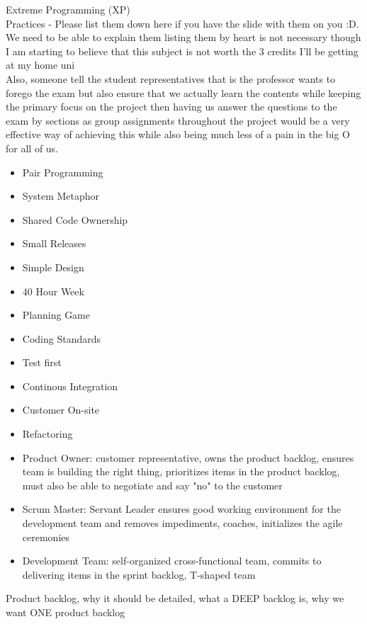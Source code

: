 \documentclass[10pt]{article}
\begin{document}
Extreme Programming (XP)\\
Practices - Please list them down here if you have the slide with them on you :D. We need to be able to explain them listing them by heart is not necessary though\\
I am starting to believe that this subject is not worth the 3 credits I'll be getting at my home uni\\
Also, someone tell the student representatives that is the professor wants to forego the exam but also ensure that we actually learn the contents while keeping the primary focus on the project then having us answer the questions to the exam by sections as group assignments throughout the project would be a very effective way of achieving this while also being much less of a pain in the big O for all of us.
\begin{itemize}
    \item Pair Programming 
    \item System Metaphor
    \item Shared Code Ownership
    \item Small Releases
    \item Simple Design
    \item 40 Hour Week
    \item Planning Game
    \item Coding Standards
    \item Test first
    \item Continous Integration 
    \item Customer On-site
    \item Refactoring
\end{itemize}
\begin{itemize}
\item Product Owner: customer representative, owns the product backlog, ensures team is building the right thing, prioritizes items in the product backlog, must also be able to negotiate and say "no" to the customer
\item Scrum Master: Servant Leader ensures good working environment for the development team and removes impediments, coaches, initializes the agile ceremonies
\item Development Team: self-organized cross-functional team, commits to delivering items in the sprint backlog, T-shaped team
\end{itemize}
Product backlog, why it should be detailed, what a DEEP backlog is, why we want ONE product backlog\\
\end{document}
